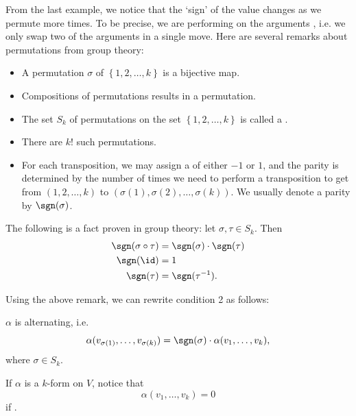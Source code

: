 \documentclass[notoc,notitlepage]{tufte-book}
\begin{document}
\begin{remark}[Permutations]\label{remark:permutations}
  From the last example, we notice that the `sign' of the value changes
  as we permute more times. To be precise, we are performing 
  on the arguments
  ,
  i.e. we only swap two of the arguments in a single move.
  Here are several remarks about permutations from group theory:
  \begin{itemize}
    \item A permutation $\sigma$ of $\left\{ 1, 2, \ldots, k \right\}$ is a
      bijective map.
    \item Compositions of permutations results in a permutation.
    \item The set $S_k$ of permutations on the set $\left\{ 1, 2, \ldots, k \right\}$
      is called a .
    \item There are $k!$ such permutations.
    \item For each transposition, we may assign a  of either $-1$ or $1$,
      and the parity is determined by the number of times we need to perform a transposition
      to get from $(1, 2, \ldots, k)$ to $(\sigma(1), \sigma(2), \ldots, \sigma(k))$. We
      usually denote a parity by $\sgn(\sigma)$.
  \end{itemize}

  The following is a fact proven in group theory: let $\sigma, \tau \in S_k$. Then
  \begin{align*}
    \sgn(\sigma \circ \tau) &= \sgn(\sigma) \cdot \sgn(\tau) \\
    \sgn(\id) &= 1 \\
    \sgn(\tau) &= \sgn(\tau^{-1}).
  \end{align*}
\end{remark}

Using the above remark, we can rewrite condition 2 as follows:

\begin{note}
  $\alpha$ is alternating, i.e.
  \begin{equation*}
    \alpha(v_{\sigma(1)}, \ldots, v_{\sigma(k)}) = \sgn(\sigma) \cdot \alpha(v_1, \ldots, v_k),
  \end{equation*}
  where $\sigma \in S_k$.
\end{note}

\begin{remark}
  If $\alpha$ is a $k$-form on $V$, notice that
  \begin{equation*}
    \alpha(v_1, \ldots, v_k) = 0
  \end{equation*}
  if .
\end{remark}
\end{document}
